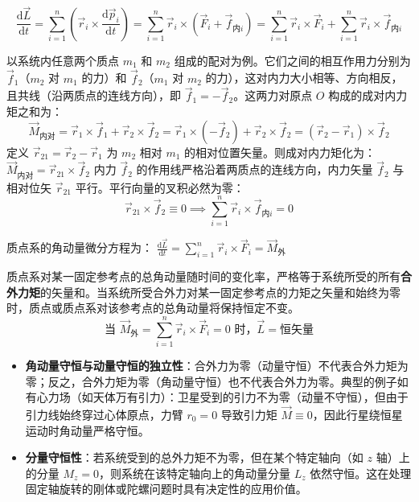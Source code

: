 \documentclass[lang=cn,11pt]{elegantbook}
\begin{document}
\[
\frac{\mathrm{d}\vec{L}}{\mathrm{d}t} = \sum_{i=1}^{n} \left( \vec{r}_i \times \frac{\mathrm{d}\vec{p}_i}{\mathrm{d}t} \right) = \sum_{i=1}^{n} \vec{r}_i \times (\vec{F}_i + \vec{f}_{\text{内}i}) = \sum_{i=1}^{n} \vec{r}_i \times \vec{F}_i + \sum_{i=1}^{n} \vec{r}_i \times \vec{f}_{\text{内}i}
\]
\begin{note}
以系统内任意两个质点 $m_1$ 和 $m_2$ 组成的配对为例。它们之间的相互作用力分别为 $\vec{f}_1$（$m_2$ 对 $m_1$ 的力）和 $\vec{f}_2$（$m_1$ 对 $m_2$ 的力），这对内力大小相等、方向相反，且共线（沿两质点的连线方向），即 $\vec{f}_1 = -\vec{f}_2$。这两力对原点 $O$ 构成的成对内力矩之和为：
\[
\vec{M}_{\text{内对}} = \vec{r}_1 \times \vec{f}_1 + \vec{r}_2 \times \vec{f}_2 = \vec{r}_1 \times (-\vec{f}_2) + \vec{r}_2 \times \vec{f}_2 = (\vec{r}_2 - \vec{r}_1) \times \vec{f}_2
\]
定义 $\vec{r}_{21} = \vec{r}_2 - \vec{r}_1$ 为 $m_2$ 相对 $m_1$ 的相对位置矢量。则成对内力矩化为：
 \(\vec{M}_{\text{内对}} = \vec{r}_{21} \times \vec{f}_2\) 
内力 $\vec{f}_2$ 的作用线严格沿着两质点的连线方向，内力矢量 $\vec{f}_2$ 与相对位矢 $\vec{r}_{21}$ 平行。平行向量的叉积必然为零：
\[
\vec{r}_{21} \times \vec{f}_2 \equiv 0 \implies \sum_{i=1}^{n} \vec{r}_i \times \vec{f}_{\text{内}i} = 0
\]
\end{note}
质点系的角动量微分方程为：
 \(\frac{\mathrm{d}\vec{L}}{\mathrm{d}t} = \sum_{i=1}^{n} \vec{r}_i \times \vec{F}_i = \vec{M}_{\text{外}}\) 

\begin{theorem}[质点系角动量定理与角动量守恒]
 质点系对某一固定参考点的总角动量随时间的变化率，严格等于系统所受的所有\textbf{合外力矩}的矢量和。当系统所受合外力对某一固定参考点的力矩之矢量和始终为零时，质点或质点系对该参考点的总角动量将保持恒定不变。
\[
\text{当 } \vec{M}_{\text{外}} = \sum_{i=1}^{n} \vec{r}_i \times \vec{F}_i = 0 \text{ 时，} \vec{L} = \text{恒矢量}
\]
\begin{itemize}
\item \textbf{角动量守恒与动量守恒的独立性}：合外力为零（动量守恒）不代表合外力矩为零；反之，合外力矩为零（角动量守恒）也不代表合外力为零。典型的例子如有心力场（如天体万有引力）：卫星受到的引力不为零（动量不守恒），但由于引力线始终穿过心体原点，力臂 $r_0=0$ 导致引力矩 $\vec{M} \equiv 0$，因此行星绕恒星运动时角动量严格守恒。
\item \textbf{分量守恒性}：若系统受到的总外力矩不为零，但在某个特定轴向（如 $z$ 轴）上的分量 $M_{z} = 0$，则系统在该特定轴向上的角动量分量 $L_z$ 依然守恒。这在处理固定轴旋转的刚体或陀螺问题时具有决定性的应用价值。
\end{itemize}
\end{theorem}
\end{document}
